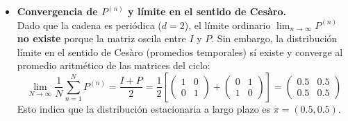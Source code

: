 \documentclass[10pt,a4paper]{book}
\begin{document}
\begin{itemize}
    \item[\textbf{d)}] \textbf{Convergencia de $P^{(n)}$ y límite en el sentido de Cesàro.} \\
    Dado que la cadena es periódica ($d=2$), el límite ordinario $\lim_{n \to \infty} P^{(n)}$ \textbf{no existe} porque la matriz oscila entre $I$ y $P$. 
    Sin embargo, la distribución límite en el sentido de Cesàro (promedios temporales) sí existe y converge al promedio aritmético de las matrices del ciclo:
    \[ \lim_{N \to \infty} \frac{1}{N} \sum_{n=1}^{N} P^{(n)} = \frac{I + P}{2} = \frac{1}{2} \left[ \begin{pmatrix} 1 & 0 \\ 0 & 1 \end{pmatrix} + \begin{pmatrix} 0 & 1 \\ 1 & 0 \end{pmatrix} \right] = \begin{pmatrix} 0.5 & 0.5 \\ 0.5 & 0.5 \end{pmatrix} \]
    Esto indica que la distribución estacionaria a largo plazo es $\pi = (0.5, 0.5)$.
\end{itemize}
\end{document}
